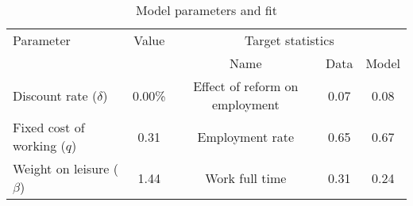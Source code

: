\begin{table}[htbp]\caption{Model parameters and fit}\label{table:model_param}\centering\footnotesize\begin{tabular}{lcccc} \toprule  Parameter & Value & \multicolumn{3}{c}{Target statistics}  \\\cline{3-5}  &  &  Name & Data & Model  \\\midrule    Discount rate ($\delta$)      &0.00\%& Effect of reform on employment   & 0.07 &0.08\\ Fixed cost of working ($q$)   &0.31& Employment rate                  & 0.65 &0.67\\ Weight on leisure ($\beta$)   &1.44& Work full time             & 0.31 &0.24\\  \bottomrule\end{tabular}\end{table}